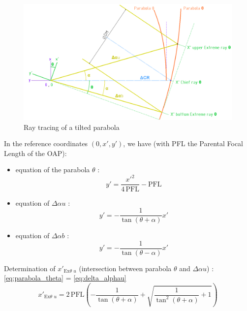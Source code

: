 \documentclass[12pt,a4paper]{article}
\begin{document}
\begin{figure}[H]
	\begin{center}
		\includegraphics[width=.7\textwidth]{images/sketch_ray_tracing_OAP0.PNG}
		\caption{Ray tracing of a tilted parabola}\label{fig:sketch_ray_tracing_OAP0}
	\end{center}
\end{figure}
In the reference coordinates $\left(0,x',y'\right)$, we have (with PFL the Parental Focal Length of the OAP):
\begin{itemize}
	\item equation of the parabola $\theta$ : 
	\begin{equation}
	y' = \frac{x'^2}{4\,\text{PFL}}-\text{PFL}	\label{eq:parabola_theta}
	\end{equation}
	\item equation of $\Delta\alpha u$ : \begin{equation}
	y' = -\frac{1}{\tan\left(\theta+\alpha\right)}x' \label{eq:delta_alphau}
	\end{equation}
	\item equation of $\Delta\alpha b$ : \begin{equation}
	y' = -\frac{1}{\tan\left(\theta-\alpha\right)}x' \label{eq:delta_alphab}
	\end{equation}
\end{itemize}
%

Determination of $x'_{\text{Ex}\theta\,\,u}$ (intersection between parabola $\theta$ and $\Delta\alpha u$) :\\ \eqref{eq:parabola_theta} = \eqref{eq:delta_alphau}\\
\begin{equation}
	x'_{\text{Ex}\theta\,\,u} = 2\,\text{PFL}\left(-\frac{1}{\tan\left(\theta+\alpha\right)}+\sqrt{\frac{1}{\tan^2\left(\theta+\alpha\right)}+1}\right)
\end{equation}
\end{document}
